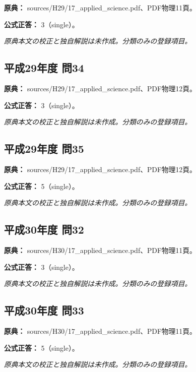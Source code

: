 \noindent\textbf{原典：} sources/H29/17\_applied\_science.pdf、PDF物理11頁。

\textbf{公式正答：} 3（single）。

\par\textit{原典本文の校正と独自解説は未作成。分類のみの登録項目。}

\subsection{平成29年度 問34}
\label{q:h29-reg-applied-34}

\noindent\textbf{原典：} sources/H29/17\_applied\_science.pdf、PDF物理12頁。

\textbf{公式正答：} 3（single）。

\par\textit{原典本文の校正と独自解説は未作成。分類のみの登録項目。}

\subsection{平成29年度 問35}
\label{q:h29-reg-applied-35}

\noindent\textbf{原典：} sources/H29/17\_applied\_science.pdf、PDF物理12頁。

\textbf{公式正答：} 5（single）。

\par\textit{原典本文の校正と独自解説は未作成。分類のみの登録項目。}

\subsection{平成30年度 問32}
\label{q:h30-reg-applied-32}

\noindent\textbf{原典：} sources/H30/17\_applied\_science.pdf、PDF物理11頁。

\textbf{公式正答：} 3（single）。

\par\textit{原典本文の校正と独自解説は未作成。分類のみの登録項目。}

\subsection{平成30年度 問33}
\label{q:h30-reg-applied-33}

\noindent\textbf{原典：} sources/H30/17\_applied\_science.pdf、PDF物理11頁。

\textbf{公式正答：} 5（single）。

\par\textit{原典本文の校正と独自解説は未作成。分類のみの登録項目。}

